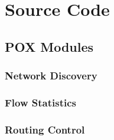 \chapter{Source Code}

\section{POX Modules}

\subsection{Network Discovery}

\subsection{Flow Statistics}

\subsection{Routing Control}
